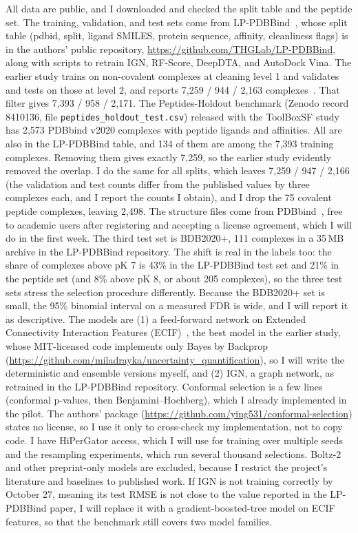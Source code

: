 \documentclass[10pt,twocolumn]{article}
\begin{document}
All data are public, and I downloaded and checked the split table and the peptide set. The training, validation, and test sets come from LP-PDBBind~\cite{lppdbbind}, whose split table (pdbid, split, ligand SMILES, protein sequence, affinity, cleanliness flags) is in the authors' public repository, \url{https://github.com/THGLab/LP-PDBBind}, along with scripts to retrain IGN, RF-Score, DeepDTA, and AutoDock Vina. The earlier study trains on non-covalent complexes at cleaning level 1 and validates and tests on those at level 2, and reports 7,259 / 944 / 2,163 complexes~\cite{rayka2025}. That filter gives 7,393 / 958 / 2,171. The Peptides-Holdout benchmark (Zenodo record 8410136, file \texttt{peptides\_holdout\_test.csv}) released with the ToolBoxSF study~\cite{durant2025} has 2,573 PDBbind v2020 complexes with peptide ligands and affinities. All are also in the LP-PDBBind table, and 134 of them are among the 7,393 training complexes. Removing them gives exactly 7,259, so the earlier study evidently removed the overlap. I do the same for all splits, which leaves 7,259 / 947 / 2,166 (the validation and test counts differ from the published values by three complexes each, and I report the counts I obtain), and I drop the 75 covalent peptide complexes, leaving 2,498. The structure files come from PDBbind~\cite{pdbbind}, free to academic users after registering and accepting a license agreement, which I will do in the first week. The third test set is BDB2020+, 111 complexes in a 35\,MB archive in the LP-PDBBind repository. The shift is real in the labels too: the share of complexes above pK 7 is 43\% in the LP-PDBBind test set and 21\% in the peptide set (and 8\% above pK 8, or about 205 complexes), so the three test sets stress the selection procedure differently. Because the BDB2020+ set is small, the 95\% binomial interval on a measured FDR is wide, and I will report it as descriptive. The models are (1) a feed-forward network on Extended Connectivity Interaction Features (ECIF)~\cite{ecif}, the best model in the earlier study, whose MIT-licensed code implements only Bayes by Backprop (\url{https://github.com/miladrayka/uncertainty_quantification}), so I will write the deterministic and ensemble versions myself, and (2) IGN, a graph network, as retrained in the LP-PDBBind repository. Conformal selection is a few lines (conformal p-values, then Benjamini--Hochberg), which I already implemented in the pilot. The authors' package (\url{https://github.com/ying531/conformal-selection}) states no license, so I use it only to cross-check my implementation, not to copy code. I have HiPerGator access, which I will use for training over multiple seeds and the resampling experiments, which run several thousand selections. Boltz-2 and other preprint-only models are excluded, because I restrict the project's literature and baselines to published work. If IGN is not training correctly by October 27, meaning its test RMSE is not close to the value reported in the LP-PDBBind paper, I will replace it with a gradient-boosted-tree model on ECIF features, so that the benchmark still covers two model families.
\end{document}
